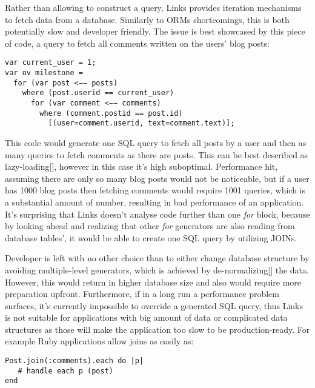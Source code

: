 Rather than allowing to construct a query, Links provides iteration mechanisms to fetch data from a database. Similarly to ORMs shortcomings, this is both potentially slow and developer friendly. The issue is best showcased by this piece of code, a query to fetch all comments written on the users' blog posts:

\begin{codelisting}
\begin{verbatim}
var current_user = 1;
var ov milestone =
  for (var post <−− posts)
    where (post.userid == current_user)
      for (var comment <−− comments)
        where (comment.postid == post.id)
          [(user=comment.userid, text=comment.text)];
\end{verbatim}
\end{codelisting}

This code would generate one SQL query to fetch all posts by a user and then as many queries to fetch comments as there are posts. This can be best described as lazy-loading[], however in this case it's high suboptimal. Performance hit, assuming there are only so many blog posts would not be noticeable, but if a user has 1000 blog posts then fetching comments would require 1001 queries, which is a substantial amount of number, resulting in bad performance of an application. It's surprising that Links doesn't analyse code further than one \textit{for} block, because by looking ahead and realizing that other \textit{for} generators are also reading from database tables', it would be able to create one SQL query by utilizing JOINs. 

Developer is left with no other choice than to either change database structure by avoiding multiple-level generators, which is achieved by de-normalizing[] the data. However, this would return in higher database size and also would require more preparation upfront. Furthermore, if in a long run a performance problem surfaces, it's currently impossible to override a generated SQL query, thus Links is not suitable for applications with big amount of data or complicated data structures as those will make the application too slow to be production-ready. For example Ruby applications allow joins as easily as:

\begin{codelisting}
\begin{verbatim}
Post.join(:comments).each do |p|
   # handle each p (post)
end
\end{verbatim}
\end{codelisting}

